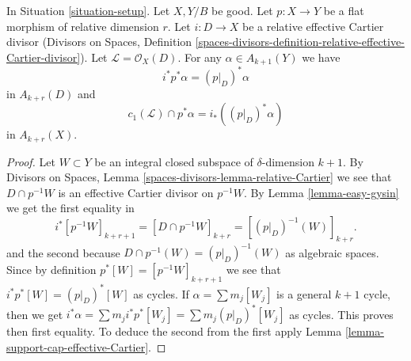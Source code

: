 \begin{lemma}
\label{lemma-relative-effective-cartier}
In Situation \ref{situation-setup}. Let $X, Y/B$ be good.
Let $p : X \to Y$ be a flat morphism of relative dimension $r$.
Let $i : D \to X$ be a relative effective Cartier divisor
(Divisors on Spaces, Definition
\ref{spaces-divisors-definition-relative-effective-Cartier-divisor}).
Let $\mathcal{L} = \mathcal{O}_X(D)$.
For any $\alpha \in A_{k + 1}(Y)$ we have
$$
i^*p^*\alpha = (p|_D)^*\alpha
$$
in $A_{k + r}(D)$ and
$$
c_1(\mathcal{L}) \cap p^*\alpha = i_* ((p|_D)^*\alpha)
$$
in $A_{k + r}(X)$.
\end{lemma}

\begin{proof}
Let $W \subset Y$ be an integral closed subspace of $\delta$-dimension
$k + 1$. By Divisors on Spaces, Lemma
\ref{spaces-divisors-lemma-relative-Cartier}
we see that $D \cap p^{-1}W$ is an effective
Cartier divisor on $p^{-1}W$. By Lemma \ref{lemma-easy-gysin}
we get the first equality in
$$
i^*[p^{-1}W]_{k + r + 1} =
[D \cap p^{-1}W]_{k + r} =
[(p|_D)^{-1}(W)]_{k + r}.
$$
and the second because $D \cap p^{-1}(W) = (p|_D)^{-1}(W)$ as algebraic spaces.
Since by definition $p^*[W] = [p^{-1}W]_{k + r + 1}$ we see that
$i^*p^*[W] = (p|_D)^*[W]$ as cycles. If $\alpha = \sum m_j[W_j]$ is a
general $k + 1$ cycle, then we get
$i^*\alpha = \sum m_j i^*p^*[W_j] = \sum m_j(p|_D)^*[W_j]$ as cycles.
This proves then first equality. To deduce the second from the
first apply Lemma \ref{lemma-support-cap-effective-Cartier}.
\end{proof}





























